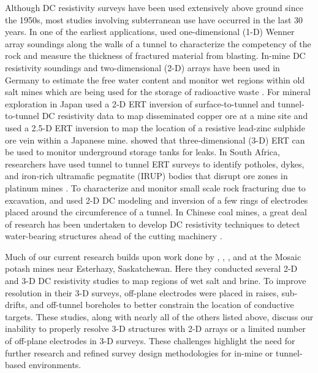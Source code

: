 \documentclass[preprint,authoryear,12pt]{elsarticle}
\begin{document}
Although DC resistivity surveys have been used extensively above ground since the 1950s, most studies involving subterranean use have occurred in the last 30 years. In one of the earliest applications, \cite{Scott1968} used one-dimensional (1-D) Wenner array soundings along the walls of a tunnel to characterize the competency of the rock and measure the thickness of fractured material from blasting. In-mine DC resistivity soundings and two-dimensional (2-D) arrays have been used in Germany to estimate the free water content and monitor wet regions within old salt mines which are being used for the storage of radioactive waste \citep{Kessels1985,Yaramanci2000}. For mineral exploration in Japan \cite{Sasaki1990} used a 2-D ERT inversion of surface-to-tunnel and tunnel-to-tunnel DC resistivity data to map disseminated copper ore at a mine site and \cite{Arai1995} used a 2.5-D ERT inversion to map the location of a resistive lead-zinc sulphide ore vein within a Japanese mine. \cite{Ramirez1996} showed that three-dimensional (3-D) ERT can be used to monitor underground storage tanks for leaks. In South Africa, researchers have used tunnel to tunnel ERT surveys to identify potholes, dykes, and iron-rich ultramafic pegmatite (IRUP) bodies that disrupt ore zones in platinum mines \citep{Schoor2005,VanSchoor2010}. To characterize and monitor small scale rock fracturing due to excavation, \cite{Kruschwitz2004} and \cite{Gibert2006} used 2-D DC modeling and inversion of a few rings of electrodes placed around the circumference of a tunnel. In Chinese coal mines, a great deal of research has been undertaken to develop DC resistivity techniques to detect water-bearing structures ahead of the cutting machinery \citep{Wang2011,Han2011}.

Much of our current research builds upon work done by \cite{Maxwell2005}, \cite{Eso2006a,Eso2006b,Eso2006}, \cite{Cisyk2014}, \cite{Maxwell2016} and \cite{Mitchell2016a,Mitchell2016} at the Mosaic potash mines near Esterhazy, Saskatchewan. Here they conducted several 2-D and 3-D DC resistivity studies to map regions of wet salt and brine. To improve resolution in their 3-D surveys, off-plane electrodes were placed in raises, sub-drifts, and off-tunnel boreholes to better constrain the location of conductive targets. These studies, along with nearly all of the others listed above, discuss our inability to properly resolve 3-D structures with 2-D arrays or a limited number of off-plane electrodes in 3-D surveys. These challenges highlight the need for further research and refined survey design methodologies for in-mine or tunnel-based environments.
\end{document}
